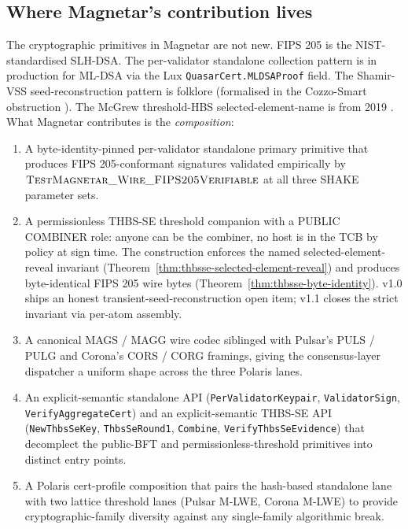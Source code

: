 \subsection{Where Magnetar's contribution lives}
\label{sec:related:contribution}

The cryptographic primitives in Magnetar are not new. FIPS 205
\cite{fips205} is the NIST-standardised SLH-DSA. The per-validator
standalone collection pattern is in production for ML-DSA via the
Lux \texttt{QuasarCert.MLDSAProof} field. The Shamir-VSS
seed-reconstruction pattern is folklore (formalised in the
Cozzo-Smart obstruction \cite{cosmin2021}). The McGrew threshold-HBS
selected-element-name is from 2019 \cite{mcgrew2019}. What
Magnetar contributes is the \emph{composition}:
\begin{enumerate}[leftmargin=2em,nosep]
  \item A byte-identity-pinned per-validator standalone primary
        primitive that produces FIPS 205-conformant signatures
        validated empirically by
        $\textsc{TestMagnetar\_Wire\_FIPS205Verifiable}$ at all
        three SHAKE parameter sets.
  \item A permissionless THBS-SE threshold companion with a
        PUBLIC COMBINER role: anyone can be the combiner, no host
        is in the TCB by policy at sign time. The construction
        enforces the named selected-element-reveal invariant
        (Theorem~\ref{thm:thbsse-selected-element-reveal}) and
        produces byte-identical FIPS 205 wire bytes
        (Theorem~\ref{thm:thbsse-byte-identity}). v1.0 ships an
        honest transient-seed-reconstruction open item; v1.1
        closes the strict invariant via per-atom assembly.
  \item A canonical MAGS / MAGG wire codec siblinged with
        Pulsar's PULS / PULG and Corona's CORS / CORG framings,
        giving the consensus-layer dispatcher a uniform shape
        across the three Polaris lanes.
  \item An explicit-semantic standalone API
        (\texttt{PerValidatorKeypair}, \texttt{ValidatorSign},
        \texttt{VerifyAggregateCert}) and an explicit-semantic
        THBS-SE API
        (\texttt{NewThbsSeKey}, \texttt{ThbsSeRound1},
        \texttt{Combine}, \texttt{VerifyThbsSeEvidence}) that
        decomplect the public-BFT and permissionless-threshold
        primitives into distinct entry points.
  \item A Polaris cert-profile composition that pairs the
        hash-based standalone lane with two lattice threshold
        lanes (Pulsar M-LWE, Corona M-LWE) to provide
        cryptographic-family diversity against any single-family
        algorithmic break.
\end{enumerate}

